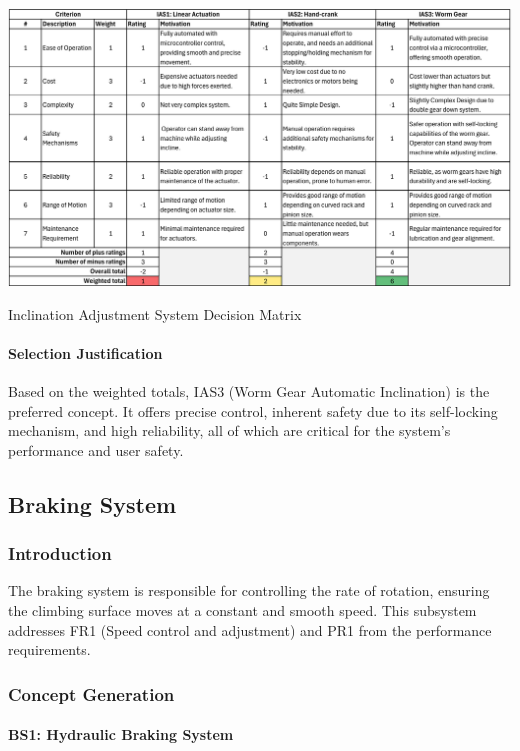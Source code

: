 \begin{table}[H]
    \centering
    \includegraphics[width=1\linewidth]{tables/IAS_dec_matrix.pdf}
    \caption{Inclination Adjustment System Decision Matrix}
    \label{tab:ias_decision_matrix}
\end{table}

\paragraph{Selection Justification}

Based on the weighted totals, IAS3 (Worm Gear Automatic Inclination) is the preferred concept. It offers precise control, inherent safety due to its self-locking mechanism, and high reliability, all of which are critical for the system's performance and user safety.

\subsection{Braking System}

\subsubsection{Introduction}

The braking system is responsible for controlling the rate of rotation, ensuring the climbing surface moves at a constant and smooth speed. This subsystem addresses FR1 (Speed control and adjustment) and PR1 from the performance requirements.

\subsubsection{Concept Generation}

\paragraph{BS1: Hydraulic Braking System}


